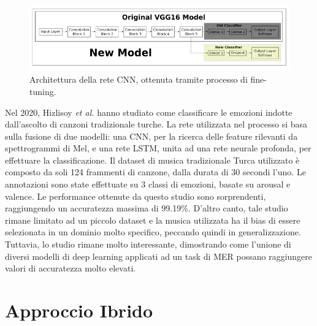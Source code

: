 \documentclass[11pt]{report}
\begin{document}
\vspace{1cm}

\begin{figure}[h]
\centering
\includegraphics[scale = 0.65]{img/vgg16.PNG}
\caption[Architettura della rete CNN, ottenuta tramite processo di fine-tuning]{Architettura della rete CNN, ottenuta tramite processo di fine-tuning\footnotemark.}
\label{fig-vgg}
\end{figure}




\vspace{1cm}


Nel 2020, Hizlisoy \textit{et al.}\cite{hizlisoy2021music} hanno studiato come classificare le emozioni indotte dall'ascolto di canzoni tradizionale turche. La rete utilizzata nel processo si basa sulla fusione di due modelli: una CNN, per la ricerca delle feature rilevanti da spettrogrammi di Mel, e una rete LSTM, unita ad una rete neurale profonda, per effettuare la classificazione. Il dataset di musica tradizionale Turca utilizzato è composto da soli 124 frammenti di canzone, dalla durata di 30 secondi l'uno. Le annotazioni sono state effettuate su 3 classi di emozioni, basate su arousal e valence. Le performance ottenute da questo studio sono sorprendenti, raggiungendo un accuratezza massima di 99.19\%. D'altro canto, tale studio rimane limitato ad un piccolo dataset e la musica utilizzata ha il bias di essere selezionata in un dominio molto specifico, peccando quindi in generalizzazione. Tuttavia, lo studio rimane molto interessante, dimostrando come l'unione di diversi modelli di deep learning applicati ad un task di MER possano raggiungere valori di accuratezza molto elevati.



\newpage

\section{Approccio Ibrido}
\end{document}
